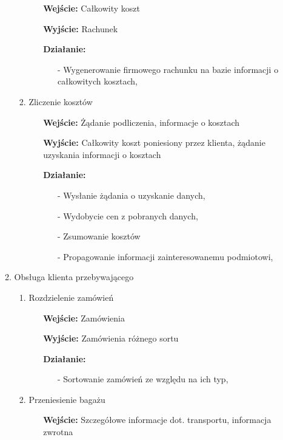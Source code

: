 \documentclass[a4paper, 11pt]{article}
\begin{document}
\begin{enumerate}[label*=\arabic*.]
\begin{enumerate}[label*=\arabic*.]
\begin{enumerate}[label*=\arabic*.]
\begin{itemize}
					\item [\textbf{Wejście:}] Całkowity koszt
					\item [\textbf{Wyjście:}] Rachunek
					\item [\textbf{Działanie:}] 
					\begin{itemize}
						\item[-] Wygenerowanie firmowego rachunku na bazie informacji o całkowitych kosztach,
					\end{itemize}
				\end{itemize}
				\item Zliczenie kosztów
				\begin{itemize}
					\item [\textbf{Wejście:}] Żądanie podliczenia, informacje o kosztach
					\item [\textbf{Wyjście:}] Całkowity koszt poniesiony przez klienta, żądanie uzyskania informacji o kosztach
					\item [\textbf{Działanie:}] 
					\begin{itemize}
						\item[-] Wysłanie żądania o uzyskanie danych,
						\item[-] Wydobycie cen z pobranych danych,
						\item[-] Zsumowanie kosztów
						\item[-] Propagowanie informacji zainteresowanemu podmiotowi,
					\end{itemize}
				\end{itemize}
			\end{enumerate}						
			\item Obsługa klienta przebywającego
			\begin{enumerate}[label*=\arabic*.]
				\item Rozdzielenie zamówień
				\begin{itemize}
					\item [\textbf{Wejście:}] Zamówienia
					\item [\textbf{Wyjście:}] Zamówienia różnego sortu
					\item [\textbf{Działanie:}] 
					\begin{itemize}
						\item[-] Sortowanie zamówień ze względu na ich typ,									\end{itemize}
				\end{itemize}
				\item Przeniesienie bagażu
				\begin{itemize}
					\item [\textbf{Wejście:}] Szczegółowe informacje dot. transportu, informacja zwrotna

\end{itemize}
\end{enumerate}
\end{enumerate}
\end{enumerate}
\end{document}
